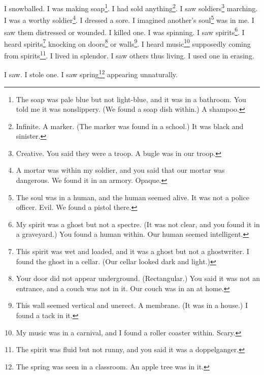 \documentclass[12pt]{book}
\begin{document}
 I snowballed. I was making soap\footnote{The soap was pale blue but not light-blue, and it was in a bathroom. You told me it was nonslippery. (We found a soap dish within.) A shampoo.}. I had sold anything\footnote{Infinite. A marker. (The marker was found in a school.) It was black and sinister.}. I saw soldiers\footnote{Creative. You said they were a troop. A bugle was in our troop.} marching. I was a worthy soldier\footnote{A mortar was within my soldier, and you said that our mortar was dangerous. We found it in an armory. Opaque.}. I dressed a sore. I imagined another's soul\footnote{The soul was in a human, and the human seemed alive. It was not a police officer. Evil. We found a pistol there.} was in me. I saw them distressed or wounded. I killed one. I was spinning. I saw spirits\footnote{My spirit was a ghost but not a spectre. (It was not clear, and you found it in a graveyard.) You found a human within. Our human seemed intelligent.}. I heard spirits\footnote{This spirit was wet and loaded, and it was a ghost but not a ghostwriter. I found the ghost in a cellar. (Our cellar looked dark and light.)} knocking on doors\footnote{Your door did not appear underground. (Rectangular.) You said it was not an entrance, and a couch was not in it. Our couch was in an at home.} or walls\footnote{This wall seemed vertical and unerect. A membrane. (It was in a house.) I found a tack in it.}. I heard music\footnote{My music was in a carnival, and I found a roller coaster within. Scary.} supposedly coming from spirits\footnote{The spirit was fluid but not runny, and you said it was a doppelganger.}. I lived in splendor. I saw others thus living. I used one in erasing. 

 I saw. I stole one. I saw spring\footnote{The spring was seen in a classroom. An apple tree was in it.} appearing unnaturally. 
\end{document}
